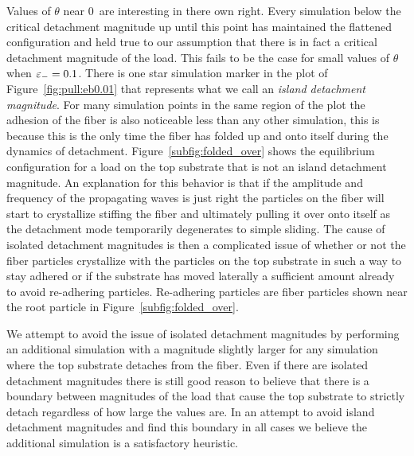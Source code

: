 {Values of $\theta$ near $0$\textdegree\ are interesting in there own right. Every simulation below the critical detachment magnitude up until this point has maintained the flattened configuration and held true to our assumption that there is in fact a critical detachment magnitude of the load. This fails to be the case for small values of $\theta$ when $\varepsilon_-=0.1$. There is one star simulation marker in the plot of Figure~\ref{fig:pull:eb0.01} that represents what we call an \textit{island detachment magnitude}. For many simulation points in the same region of the plot the adhesion of the fiber is also noticeable less than any other simulation, this is because this is the only time the fiber has folded up and onto itself during the dynamics of detachment. Figure~\ref{subfig:folded_over} shows the equilibrium configuration for a load on the top substrate that is not an island detachment magnitude. An explanation for this behavior is that if the amplitude and frequency of the propagating waves is just right the particles on the fiber will start to crystallize stiffing the fiber and ultimately pulling it over onto itself as the detachment mode temporarily degenerates to simple sliding. The cause of isolated detachment magnitudes is then a complicated issue of whether or not the fiber particles crystallize with the particles on the top substrate in such a way to stay adhered or if the substrate has moved laterally a sufficient amount already to avoid re-adhering particles. Re-adhering particles are fiber particles shown near the root particle in Figure~\ref{subfig:folded_over}.

We attempt to avoid the issue of isolated detachment magnitudes by performing an additional simulation with a magnitude slightly larger for any simulation where the top substrate detaches from the fiber. Even if there are isolated detachment magnitudes there is still good reason to believe that there is a boundary between magnitudes of the load that cause the top substrate to strictly detach regardless of how large the values are. In an attempt to avoid island detachment magnitudes and find this boundary in all cases we believe the additional simulation is a satisfactory heuristic.

}
